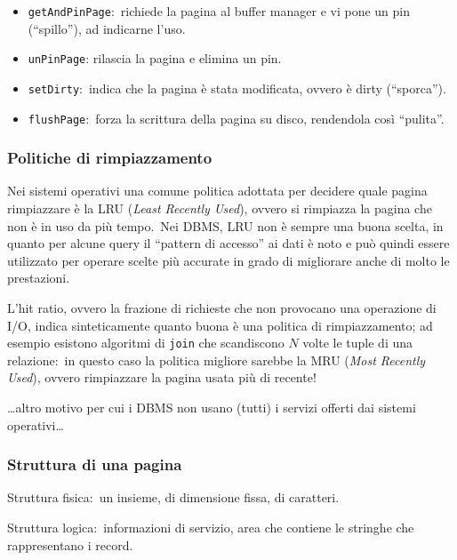 \begin{itemize}
	\item \texttt{getAndPinPage}:\ richiede la pagina al buffer manager e vi pone un pin (``spillo''), ad indicarne l'uso.
	\item \texttt{unPinPage}: rilascia la pagina e elimina un pin.
	\item \texttt{setDirty}:\ indica che la pagina è stata modificata, ovvero è dirty (``sporca'').
	\item \texttt{flushPage}:\ forza la scrittura della pagina su disco, rendendola così ``pulita''.
\end{itemize}

\subsubsection{Politiche di rimpiazzamento}

Nei sistemi operativi una comune politica adottata per decidere quale pagina rimpiazzare è la LRU (\textit{Least Recently Used}), ovvero si rimpiazza la pagina che non è in uso da più tempo.\
Nei DBMS, LRU non è sempre una buona scelta, in quanto per alcune query il ``pattern di accesso'' ai dati è noto e può quindi essere utilizzato per operare scelte più accurate in grado di migliorare anche di molto le prestazioni.\

L'hit ratio, ovvero la frazione di richieste che non provocano una operazione di I/O, indica sinteticamente quanto buona è una politica di rimpiazzamento; ad esempio esistono algoritmi di \texttt{join} che scandiscono $N$ volte le tuple di una relazione:\ in questo caso la politica migliore sarebbe la MRU (\textit{Most Recently Used}), ovvero rimpiazzare la pagina usata più di recente!\

\vspace{12pt}
\noindent\dots altro motivo per cui i DBMS non usano (tutti) i servizi offerti dai sistemi operativi\dots

\subsubsection{Struttura di una pagina}

\begin{flushleft}
	Struttura fisica:\ un insieme, di dimensione fissa, di caratteri.

	Struttura logica:\ informazioni di servizio, area che contiene le stringhe che rappresentano i record.
\end{flushleft}

